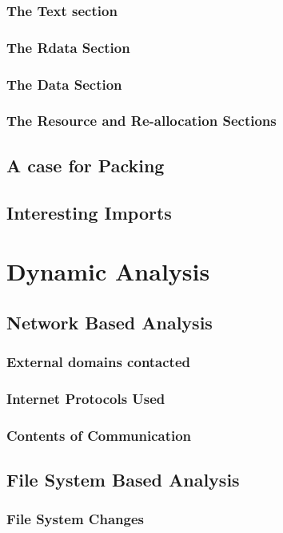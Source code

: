 \documentclass[10pt,a4paper]{article}
\begin{document}
	\subsubsection{The Text section}
	\subsubsection{The Rdata Section}
	\subsubsection{The Data Section}
	\subsubsection{The Resource and Re-allocation Sections}

\subsection{A case for Packing}

\subsection{Interesting Imports}

\section{Dynamic Analysis}
		\subsection{Network Based Analysis}
			\subsubsection{External domains contacted}
			\subsubsection{Internet Protocols Used}
			\subsubsection{Contents of Communication}

		\subsection{File System Based Analysis}
				\subsubsection{File System Changes}
\end{document}
